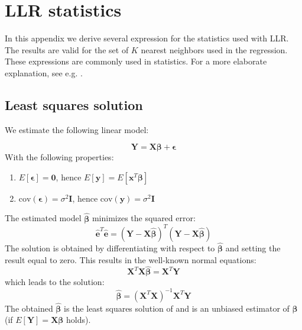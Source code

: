 \chapter{LLR statistics}\label{sec:app-statistics}

In this appendix we derive several expression for the statistics used with LLR. The results are valid for the set of $K$ nearest neighbors used in the regression. These expressions are commonly used in statistics. For a more elaborate explanation, see e.g. \cite{Rencher:08}.

\section{Least squares solution}\label{sec:app-statistics_LSsolution}
We estimate the following linear model:

\begin{equation}\label{eqn:app-linear model}
	\mathbf{Y} = \mathbf{X}\bm{\beta} + \bm{\epsilon}
\end{equation}
With the following properties:
\begin{enumerate}
	\item $E\left[\bm{\epsilon}\right]=\bm{0}$, hence $E\left[ \mathbf{y} \right] = E\left[ \mathbf{x}^T\bm{\beta} \right]$
	\item $\textrm{cov}(\bm{\epsilon})=\sigma^2\bm{I}$, hence $\textrm{cov}(\mathbf{y})=\sigma^2\bm{I}$
\end{enumerate}
The estimated model $\hat{\bm{\beta}}$ minimizes the squared error:
$$
	\hat{\mathbf{e}}^T\hat{\mathbf{e}} = \left(\bm{Y}-\bm{X}\hat{\bm{\beta}}\right)^T\left(\bm{Y}-\bm{X}\hat{\bm{\beta}}\right)
$$ 
The solution is obtained by differentiating with respect to $\hat{\bm{\beta}}$ and setting the result equal to zero. This results in the well-known normal equations:
$$
	\bm{X}^T\bm{X}\hat{\bm{\beta}} = \bm{X}^T\mathbf{Y}
$$ 
which leads to the solution:
$$
	\bm{\hat{\beta}} = \left(\bm{X}^T\bm{X}\right)^{-1}\bm{X}^T\bm{Y}
$$
The obtained $\bm{\hat{\beta}}$ is the least squares solution of  and  is an unbiased estimator of $\bm{\beta}$ (if $E[\mathbf{Y}]=\mathbf{X}\bm{\beta}$ holds).



